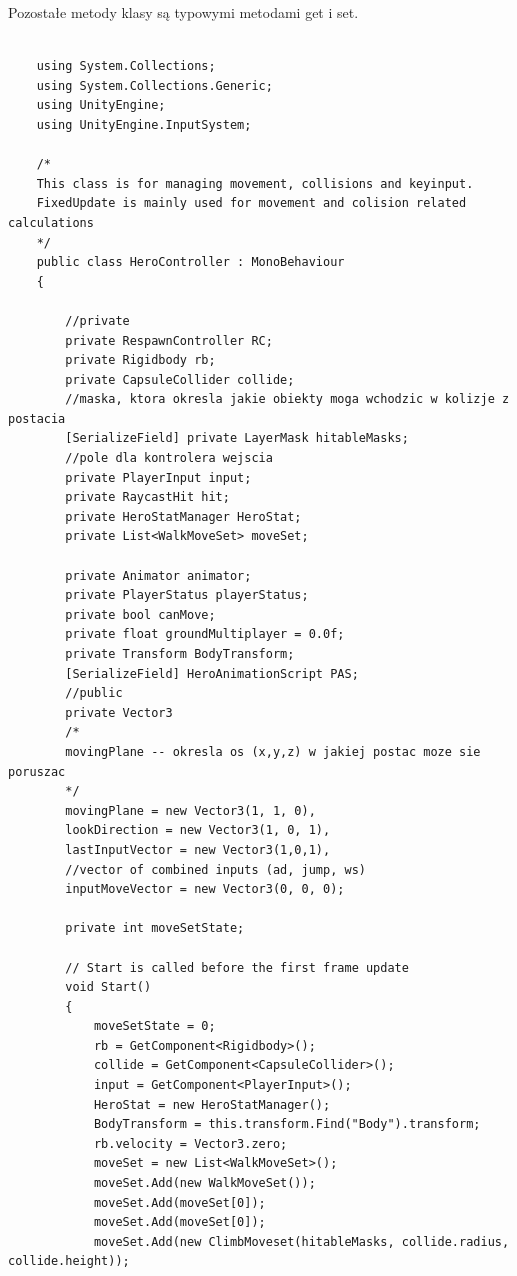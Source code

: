 \documentclass[12pt,twoside]{article}
\begin{document}
Pozostałe metody klasy są typowymi metodami get i set. 



\begin{lstlisting}[language={[Sharp]C},caption=Skyrpt HeroController -- HeroController,label={HeroScript:HeroController}]

    using System.Collections;
    using System.Collections.Generic;
    using UnityEngine;
    using UnityEngine.InputSystem;
    
    /*
    This class is for managing movement, collisions and keyinput.
    FixedUpdate is mainly used for movement and colision related calculations
    */
    public class HeroController : MonoBehaviour
    {
    
        //private
        private RespawnController RC;
        private Rigidbody rb;
        private CapsuleCollider collide;
        //maska, ktora okresla jakie obiekty moga wchodzic w kolizje z postacia
        [SerializeField] private LayerMask hitableMasks;
        //pole dla kontrolera wejscia
        private PlayerInput input;
        private RaycastHit hit;
        private HeroStatManager HeroStat;
        private List<WalkMoveSet> moveSet;
    
        private Animator animator;
        private PlayerStatus playerStatus;
        private bool canMove;
        private float groundMultiplayer = 0.0f;
        private Transform BodyTransform;
        [SerializeField] HeroAnimationScript PAS;
        //public
        private Vector3
        /*  
        movingPlane -- okresla os (x,y,z) w jakiej postac moze sie poruszac 
        */
        movingPlane = new Vector3(1, 1, 0),
        lookDirection = new Vector3(1, 0, 1),
        lastInputVector = new Vector3(1,0,1),
        //vector of combined inputs (ad, jump, ws)
        inputMoveVector = new Vector3(0, 0, 0);
    
        private int moveSetState;
    
        // Start is called before the first frame update
        void Start()
        {
            moveSetState = 0;
            rb = GetComponent<Rigidbody>();
            collide = GetComponent<CapsuleCollider>();
            input = GetComponent<PlayerInput>();
            HeroStat = new HeroStatManager();
            BodyTransform = this.transform.Find("Body").transform;
            rb.velocity = Vector3.zero;
            moveSet = new List<WalkMoveSet>();
            moveSet.Add(new WalkMoveSet()); 
            moveSet.Add(moveSet[0]); 
            moveSet.Add(moveSet[0]);
            moveSet.Add(new ClimbMoveset(hitableMasks, collide.radius, collide.height));
            

\end{lstlisting}
\end{document}
